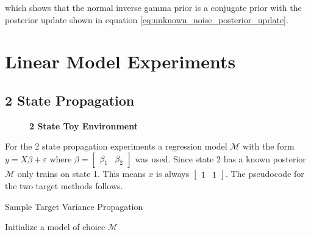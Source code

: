 {{which shows that the normal inverse gamma prior is a conjugate prior with the posterior update shown in equation \ref{eq:unknown_noise_posterior_update}.

\chapter{Linear Model Experiments}

\vspace{-1cm}

\section{2 State Propagation}\label{a:2_state_exp}

\begin{figure}[H]
    \centering
    \caption{\textbf{2 State Toy Environment}}
    \label{fig:app_2state}
\end{figure}

For the 2 state propagation experiments a regression model $\mathcal{M}$ with the form $y = X\beta + \varepsilon$ where $\beta = [\begin{array}{cc}\beta_1  & \beta_2\end{array}]$ was used. Since state 2 has a known posterior $\mathcal{M}$ only trains on state 1. This means $x$ is always $[\begin{array}{cc}1  & 1\end{array}]$. The pseudocode for the two target methods follows. 

\begin{algorithm}[H]
    \caption{Sample Target Variance Propagation}
    Initialize a model of choice $\mathcal{M}$\\
\end{algorithm}

}}
